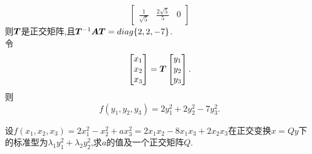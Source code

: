 \documentclass[lang=cn,11pt,normal]{elegantbook}
\begin{document}
\begin{solution}
\begin{equation}
\begin{bmatrix}
		\frac{1}{\sqrt{5}}&\frac{2\sqrt{5}}{5}&0
		\end{bmatrix}
		\end{equation}
		则$\boldsymbol{T}$是正交矩阵,且$\boldsymbol{T}^{-1}\boldsymbol{A}\boldsymbol{T}=diag\{2,2,-7\}$.\\
		令
		\begin{equation}
		\begin{bmatrix}
		x_1\\x_2\\x_3
		\end{bmatrix}
		=
		\boldsymbol{T}
		\begin{bmatrix}
		y_1\\y_2\\y_3
		\end{bmatrix}.
		\end{equation}
		则\\
		\begin{equation}
		f(y_1,y_2,y_3)=2y_1^2+2y_2^2-7y_3^2.
		\end{equation}
		\end{solution}
	\begin{exercise}
		设$f(x_1,x_2,x_3)=2x_1^2-x_2^2+ax_3^2=2x_1x_2-8x_1x_3+2x_2x_3$在正交变换$x=Qy$下的标准型为$\lambda_1y_1^2+\lambda_2y_2^2$,求$a$的值及一个正交矩阵$Q$.
	\end{exercise}
\end{document}
